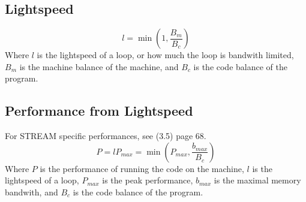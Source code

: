 \documentclass{article}
\begin{document}
		\subsection{Lightspeed}
			\begin{equation}
				l=\min\left(1,\frac{B_m}{B_c}\right)
			\end{equation}
			Where $l$ is the lightspeed of a loop, or how much the loop is bandwith limited, $B_m$ is the machine balance of the machine, and $B_c$ is the code balance of the program.
		
		\subsection{Performance from Lightspeed}
			For STREAM specific performances, see (3.5) page 68.
			\begin{equation}
				P=lP_{max}=\min\left(P_{max},\frac{b_{max}}{B_c}\right)
			\end{equation}
			Where $P$ is the performance of running the code on the machine, $l$ is the lightspeed of a loop, $P_{max}$ is the peak performance, $b_{max}$ is the maximal memory bandwith, and $B_c$ is the code balance of the program.
\end{document}
